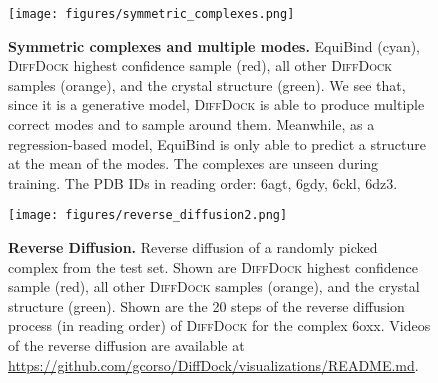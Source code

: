\documentclass{article} \usepackage{iclr2023_conference,times}
\begin{document}
\begin{figure}[ht]
    \centering
    \texttt{[image: figures/symmetric\_complexes.png]}
    \caption{\textbf{Symmetric complexes and multiple modes.} EquiBind (cyan), \textsc{DiffDock} highest confidence sample (red), all other \textsc{DiffDock} samples (orange), and the crystal structure (green). We see that, since it is a generative model, \textsc{DiffDock} is able to produce multiple correct modes and to sample around them. Meanwhile, as a regression-based model, EquiBind is only able to predict a structure at the mean of the modes. The complexes are unseen during training. The PDB IDs in reading order: 6agt, 6gdy, 6ckl, 6dz3.}
    \label{fig:symmetric_complexes}
\end{figure}



\begin{figure}[ht]
    \centering
    \texttt{[image: figures/reverse\_diffusion2.png]}
    \caption{\textbf{Reverse Diffusion.} Reverse diffusion of a randomly picked complex from the test set. Shown are \textsc{DiffDock} highest confidence sample (red), all other \textsc{DiffDock} samples (orange), and the crystal structure (green). Shown are the 20 steps of the reverse diffusion process (in reading order) of \textsc{DiffDock} for the complex 6oxx. Videos of the reverse diffusion are available at \url{https://github.com/gcorso/DiffDock/visualizations/README.md}.}
    \label{fig:reverse_diffusion2}
\end{figure}
\end{document}
